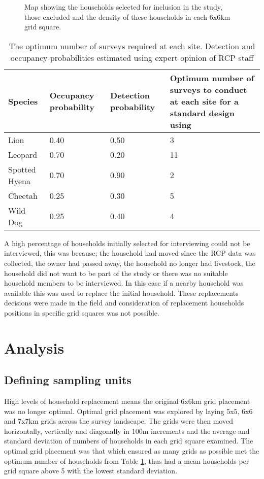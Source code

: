 \begin{figure}[h]
\centering
\setlength\fboxsep{0pt}
\setlength\fboxrule{0.5pt}
\caption{Map showing the households selected for inclusion in the study, those excluded and the density of these households in each 6x6km grid square.}
\label{fig:HH_selection}
\end{figure}

\begin{table}[h]
	\small
	\begin{center}
		\begin{tabular}{l p{3cm} p{3cm} p{5cm}}
			\hline \hline		
			Species 			& Occupancy probability	 	& Detection probability & Optimum number of surveys to conduct at each site for a standard design using \citet{MACKENZIE_2005}\\ \hline
			Lion 		& 0.40						& 0.50 & 3\\
			Leopard 	& 0.70						& 0.20 & 11\\
			Spotted 
			Hyena       & 0.70						& 0.90 & 2\\
			Cheetah 	& 0.25						& 0.30 & 5\\
			Wild Dog 	& 0.25						& 0.40 & 4\\
			\hline \hline						
		\end{tabular}
		\caption{The optimum number of surveys required at each site. Detection and occupancy probabilities estimated using expert opinion of RCP staff }
		\label{table:OptimumRepeats}
	\end{center}
\end{table}

A high percentage of households initially selected for interviewing could not be interviewed, this was because; the household had moved since the RCP data was collected, the owner had passed away, the household no longer had livestock, the household did not want to be part of the study or there was no suitable household members to be interviewed. In this case if a nearby household was available this was used to replace the initial household. These replacements decisions were made in the field and consideration of replacement households positions in specific grid squares was not possible.

\section{Analysis}

\subsection{Defining sampling units}
High levels of household replacement means the original 6x6km grid placement was no longer optimal. Optimal grid placement was explored by laying 5x5, 6x6 and 7x7km grids across the survey landscape. The grids were then moved horizontally, vertically and diagonally in 100m increments and the average and standard deviation of numbers of households in each grid square examined. The optimal grid placement was that which ensured as many grids as possible met the optimum number of households from Table \ref{table:OptimumRepeats}, thus had a mean households per grid square above 5 with the lowest standard deviation. 

